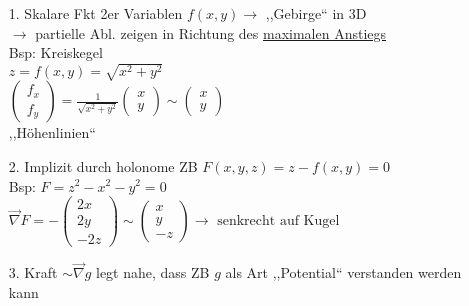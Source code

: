 \documentclass[titlepage,12pt,a4paper,ngerman]{report}
\newcommand{\tx}[1]{\textrm{#1}}
\begin{document}
\begin{itemize}
	\item[1.] Skalare Fkt 2er Variablen $ f(x,y)  \rightarrow  $ ,,Gebirge`` in 3D\\
	$ \rightarrow $ partielle Abl. zeigen in Richtung des \underline{maximalen Anstiegs}\\
	Bsp: Kreiskegel\\
	$ z = f(x,y) = \sqrt{x^2+y^2} $\\
	$ \begin{pmatrix}
	f_x\\f_y
	\end{pmatrix} = \frac{1}{\sqrt{x^2+y^2}} \begin{pmatrix}
	x\\y
	\end{pmatrix} \sim \begin{pmatrix}
	x\\y
	\end{pmatrix} $\\
	,,Höhenlinien``
	\item[2.] Implizit durch holonome ZB $ F(x,y,z) = z - f(x,y) = 0 $\\
	Bsp: $ F = z^2 - x^2 - y^2 = 0 $\\
	$ \vec{\nabla} F = - \begin{pmatrix}
	2x\\2y\\-2z
	\end{pmatrix} \sim \begin{pmatrix}
	x\\y\\-z
	\end{pmatrix} \rightarrow \tx{ senkrecht auf Kugel}$
	\item[3.] Kraft $ \sim \vec{\nabla}g $ legt nahe, dass ZB $g$ als Art ,,Potential`` verstanden werden kann
\end{itemize}
\end{document}
